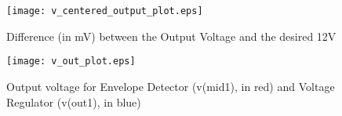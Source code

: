 \begin{figure}[H] \centering
\texttt{[image: v\_centered\_output\_plot.eps]}
\caption{Difference (in mV) between the Output Voltage and the desired 12V}
\label{fig:phase_sim}
\end{figure}

\begin{figure}[H] \centering
\texttt{[image: v\_out\_plot.eps]}
\caption{Output voltage for Envelope Detector (v(mid1), in red) and Voltage Regulator (v(out1), in blue)}
\label{fig:octave_centered_output}
\end{figure}
